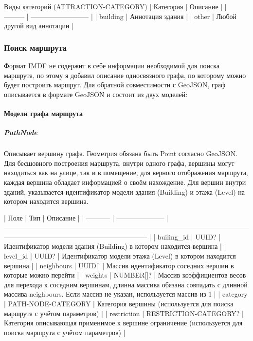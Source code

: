         Виды категорий (ATTRACTION-CATEGORY)
        | Категория | Описание                   |
        | --------- | -------------------------- |
        | building  | Аннотация здания           |
        | other     | Любой другой вид аннотации |

    \subsubsection{Поиск маршрута}
      Формат IMDF не содержит в себе информации необходимой для поиска маршрута, по этому я добавил описание односвязного графа, по которому можно будет построить маршрут. Для обратной совместимости с GeoJSON, граф описывается в формате GeoJSON и состоит из двух моделей:
      \paragraph{Модели графа маршрута}
        \subparagraph{PathNode}
          Описывает вершину графа. Геометрия обязана быть Point согласно GeoJSON. Для бесшовного построения маршрута, внутри одного графа, вершины могут находиться как на улице, так и в помещение, для верного отображения маршрута, каждая вершина обладает информацией о своём нахождение. Для вершин внутри зданий, указывается идентификатор модели здания (Building) и этажа (Level) на котором находится вершина.

          | Поле        | Тип                   | Описание                                                                                                                                                                    |
          | ----------- | --------------------- | --------------------------------------------------------------------------------------------------------------------------------------------------------------------------- |
          | builing\_id  | UUID?                 | Идентификатор модели здания (Building) в котором находится вершина                                                                                                          |
          | level\_id    | UUID?                 | Идентификатор модели этажа (Level) в котором находится вершина                                                                                                              |
          | neighbours  | UUID[]                | Массив идентификатор соседних вершин в которые можно перейти                                                                                                                |
          | weights     | NUMBER[]?             | Массив коэффициентов весов для перехода к соседним вершинам, длинна массива обязана совпадать с длинной массива neighbours. Если массив не указан, используется массив из 1 |
          | category    | PATH-NODE-CATEGORY    | Категория вершины (используется для поиска маршрута с учётом параметров)                                                                                                    |
          | restriction | RESTRICTION-CATEGORY? | Категория описывающая применимое к вершине ограничение (используется для поиска маршрута с учётом параметров)                                                               |

